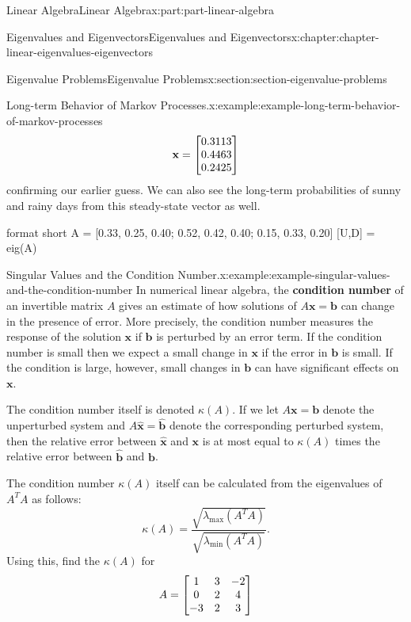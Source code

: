 \documentclass[twoside,10pt,]{book}
\newcommand{\terminology}[1]{\textbf{#1}}
\numberwithin{equation}{part}
\providecommand{\vb}[1]{\mathbf{#1}}
\begin{document}
\begin{partptx}{Linear Algebra}{}{Linear Algebra}{}{}{x:part:part-linear-algebra}
\begin{chapterptx}{Eigenvalues and Eigenvectors}{}{Eigenvalues and Eigenvectors}{}{}{x:chapter:chapter-linear-eigenvalues-eigenvectors}
\begin{sectionptx}{Eigenvalue Problems}{}{Eigenvalue Problems}{}{}{x:section:section-eigenvalue-problems}
\begin{example}{Long-term Behavior of Markov Processes.}{x:example:example-long-term-behavior-of-markov-processes}
\begin{equation*}
\vb{x} = \mqty[0.3113 \\ 0.4463 \\ 0.2425]
\end{equation*}
confirming our earlier guess. We can also see the long-term probabilities of sunny and rainy days from this steady-state vector as well.%
\end{example}
\begin{sageinput}
format short
A = [0.33, 0.25, 0.40; 0.52, 0.42, 0.40; 0.15, 0.33, 0.20]
[U,D] = eig(A)
\end{sageinput}
\begin{example}{Singular Values and the Condition Number.}{x:example:example-singular-values-and-the-condition-number}%
In numerical linear algebra, the \terminology{condition number} of an invertible matrix \(A\) gives an estimate of how solutions of \(A\vb{x} = \vb{b}\) can change in the presence of error. More precisely, the condition number measures the response of the solution \(\vb{x}\) if \(\vb{b}\) is perturbed by an error term. If the condition number is small then we expect a small change in \(\vb{x}\) if the error in \(\vb{b}\) is small. If the condition is large, however, small changes in \(\vb{b}\) can have significant effects on \(\vb{x}\).%
\par
The condition number itself is denoted \(\kappa(A)\). If we let \(A\vb{x} = \vb{b}\) denote the unperturbed system and \(A\hat{\vb{x}} = \hat{\vb{b}}\) denote the corresponding perturbed system, then the relative error between \(\hat{\vb{x}}\) and \(\vb{x}\) is at most equal to \(\kappa(A)\) times the relative error between \(\hat{\vb{b}}\) and \(\vb{b}\).%
\par
The condition number \(\kappa(A)\) itself can be calculated from the eigenvalues of \(A^{T}A\) as follows:%
\begin{equation*}
\kappa(A) = \frac{\sqrt{\lambda_{\text{max}}(A^{T}A)}}{\sqrt{\lambda_{\text{min}}(A^{T}A)}}.
\end{equation*}
Using this, find the \(\kappa(A)\) for%
\begin{equation*}
A = \mqty[1 & 3 & -2 \\ 0 & 2 & 4 \\ -3 & 2 & 3]
\end{equation*}
%
\end{example}
\begin{sageinput}
\end{sageinput}

\end{sectionptx}
\end{chapterptx}
\end{partptx}
\end{document}
